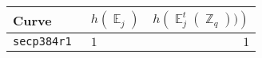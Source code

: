 \documentclass[11pt,fleqn]{article}
\newcommand{\Ejt}{\ensuremath{\BbbE^t_j(\BbbZ_q))} }
\newcommand{\Ej}{\ensuremath{\BbbE_j} }
\begin{document}
\begin{tabularx}{\textwidth}{llR}
\textbf{Curve}            &$h(\Ej)$ & $h(\Ejt)$ \\
\hline
\texttt{\footnotesize secp384r1     }& $\scriptstyle 1  $    & $\scriptstyle 1                                                                                        $\\

\end{tabularx}
\end{document}
